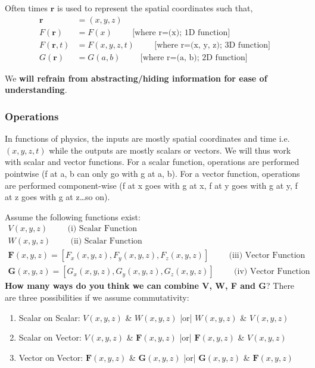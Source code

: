Often times \( \mathbf{r} \) is used to represent the spatial coordinates
such that,
\begin{align*}
  \mathbf{r} &= (x, y, z) \\
  F(\mathbf{r}) &= F(x) \hspace{1cm} \text{[where r=(x); 1D function]} \\
  F(\mathbf{r}, t) &= F(x, y, z, t) \hspace{1cm} \text{[where r=(x, y, z); 3D function]} \\
  G(\mathbf{r}) &= G(a, b) \hspace{1cm} \text{[where r=(a, b); 2D function]}
\end{align*}

We \textbf{will refrain from abstracting/hiding information for ease of
understanding}.

\subsubsection{Operations}

In functions of physics, the inputs are mostly spatial coordinates and
time i.e. \((x, y, z, t)\) while the outputs are mostly scalars or
vectors. We will thus work with scalar and vector functions. For a scalar
function, operations are performed pointwise (f at a, b can only go with
g at a, b). For a vector function, operations are performed component-wise
(f at x goes with g at x, f at y goes with g at y, f at z goes with g at
z{\ldots}so on).

Assume the following functions exist:
\begin{align*}
  V(x, y, z) \hspace{1cm} \text{(i) Scalar Function} \\
  W(x, y, z) \hspace{1cm} \text{(ii) Scalar Function} \\
  \mathbf{F}(x, y, z) = \left[F_x(x, y, z), F_y(x, y, z), F_z(x, y, z)\right] \hspace{1cm} \text{(iii) Vector Function} \\
  \mathbf{G}(x, y, z) = \left[G_x(x, y, z), G_y(x, y, z), G_z(x, y, z)\right] \hspace{1cm} \text{(iv) Vector Function}
\end{align*}
\textbf{How many ways do you think we can combine V, W, F and G}? There
are three possibilities if we assume commutativity:
\begin{enumerate}
  \item Scalar on Scalar: \(V(x, y, z)\) \& \(W(x, y, z)\) |or| \(W(x, y, z)\) \& \(V(x, y, z)\)
  \item Scalar on Vector: \(V(x, y, z)\) \& \(\mathbf{F}(x, y, z)\) |or| \(\mathbf{F}(x, y, z)\) \& \(V(x, y, z)\)
  \item Vector on Vector: \(\mathbf{F}(x, y, z)\) \& \(\mathbf{G}(x, y, z)\) |or| \(\mathbf{G}(x, y, z)\) \& \(\mathbf{F}(x, y, z)\)
\end{enumerate}

